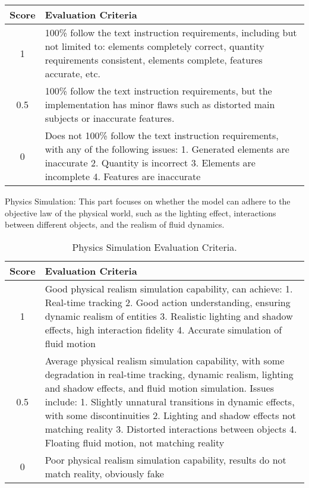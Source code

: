 \documentclass{article} \usepackage{iclr2024_conference,times}
\begin{document}
{\begin{table}[h]
\begin{tabular}{cp{11cm}}
\textbf{Score} & \textbf{Evaluation Criteria} \\
\midrule
1  & 100\% follow the text instruction requirements, including but not limited to: elements completely correct, quantity requirements consistent, elements complete, features accurate, etc. \\
\midrule
0.5  & 100\% follow the text instruction requirements, but the implementation has minor flaws such as distorted main subjects or inaccurate features. \\
\midrule
0  & Does not 100\% follow the text instruction requirements, with any of the following issues:  1. Generated elements are inaccurate  2. Quantity is incorrect  3. Elements are incomplete  4. Features are inaccurate \\
\bottomrule
\end{tabular}
\end{table}



Physics Simulation: This part focuses on whether the model can adhere to the objective law of the physical world, such as the lighting effect, interactions between different objects, and the realism of fluid dynamics. 


\begin{table}[h]
\centering
\caption{Physics Simulation Evaluation Criteria.}
\label{sample-table}
\small

\begin{tabular}{cp{11cm}}
\toprule

\textbf{Score} & \textbf{Evaluation Criteria} \\
\midrule
1  & Good physical realism simulation capability, can achieve: 1. Real-time tracking 2. Good action understanding, ensuring dynamic realism of entities 3. Realistic lighting and shadow effects, high interaction fidelity 4. Accurate simulation of fluid motion \\
\midrule
0.5  & Average physical realism simulation capability, with some degradation in real-time tracking, dynamic realism, lighting and shadow effects, and fluid motion simulation. Issues include: 1. Slightly unnatural transitions in dynamic effects, with some discontinuities 2. Lighting and shadow effects not matching reality 3. Distorted interactions between objects 4. Floating fluid motion, not matching reality \\
\midrule
0  & Poor physical realism simulation capability, results do not match reality, obviously fake \\


\end{tabular}
\end{table}}
\end{document}
